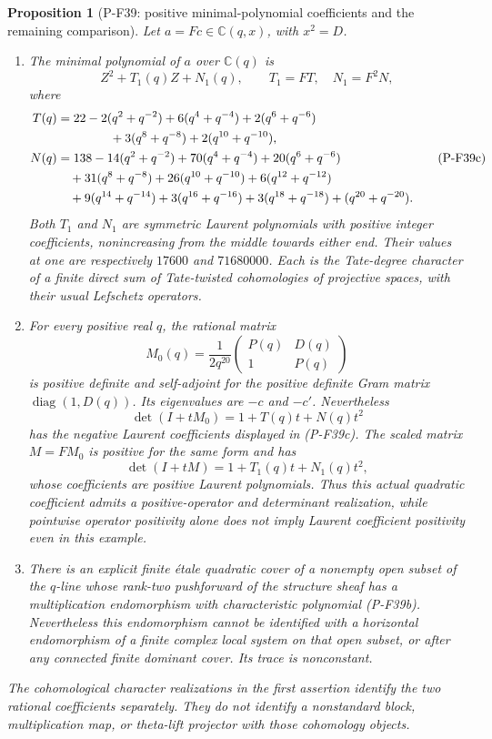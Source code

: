 \documentclass[11pt,a4paper]{article}
\newtheorem{proposition}{Proposition}[section]
\begin{document}
\begin{proposition}[P-F39: positive minimal-polynomial coefficients and the remaining comparison]
\label{prop:nonstandardtracenorm}
Let $a=Fc\in\mathbb C(q,x)$, with $x^2=D$.
\begin{enumerate}
\item The minimal polynomial of $a$ over $\mathbb C(q)$ is
\[
                   Z^2+T_1(q)Z+N_1(q),
 \qquad T_1=FT,\quad N_1=F^2N,
 \tag{P-F39b}
\]
where
\[
 \begin{split}
 T(q)&=22-2(q^2+q^{-2})+6(q^4+q^{-4})
       +2(q^6+q^{-6})\\
     &\hspace{15mm}+3(q^8+q^{-8})+2(q^{10}+q^{-10}),\\
 N(q)&=138-14(q^2+q^{-2})+70(q^4+q^{-4})
      +20(q^6+q^{-6})\\
     &\quad+31(q^8+q^{-8})+26(q^{10}+q^{-10})
      +6(q^{12}+q^{-12})\\
     &\quad+9(q^{14}+q^{-14})+3(q^{16}+q^{-16})
      +3(q^{18}+q^{-18})+(q^{20}+q^{-20}).
 \end{split}
 \tag{P-F39c}
\]
Both $T_1$ and $N_1$ are symmetric Laurent polynomials with positive
integer coefficients, nonincreasing from the middle towards either
end. Their values at one are respectively $17600$ and $71680000$.
Each is the Tate-degree character of a finite direct sum of
Tate-twisted cohomologies of projective spaces, with their usual
Lefschetz operators.
\item For every positive real $q$, the rational matrix
\[
 M_0(q)=\frac1{2q^{20}}
          \begin{pmatrix}P(q)&D(q)\\1&P(q)\end{pmatrix}
 \tag{P-F39k}
\]
is positive definite and self-adjoint for the positive definite
Gram matrix $\operatorname{diag}(1,D(q))$. Its eigenvalues
are $-c$ and $-c'$. Nevertheless
\[
       \det(I+tM_0)=1+T(q)t+N(q)t^2
 \tag{P-F39l}
\]
has the negative Laurent coefficients displayed in (P-F39c).
The scaled matrix $M=FM_0$ is positive for the same form and has
\[
       \det(I+tM)=1+T_1(q)t+N_1(q)t^2,
 \tag{P-F39m}
\]
whose coefficients are positive Laurent polynomials.
Thus this actual quadratic coefficient admits a positive-operator
and determinant realization, while pointwise operator positivity
alone does not imply Laurent coefficient positivity even in this
example.
\item There is an explicit finite \emph{\'{e}tale} quadratic cover
of a nonempty open subset of the $q$-line whose rank-two pushforward
of the structure sheaf has a multiplication endomorphism with
characteristic polynomial (P-F39b). Nevertheless this endomorphism
cannot be identified with a horizontal endomorphism of a finite
complex local system on that open subset, or after any connected
finite dominant cover. Its trace is nonconstant.
\end{enumerate}
The cohomological character realizations in the first assertion
identify the two rational coefficients separately. They do not
identify a nonstandard block, multiplication map, or theta-lift
projector with those cohomology objects.
\end{proposition}
\end{document}

